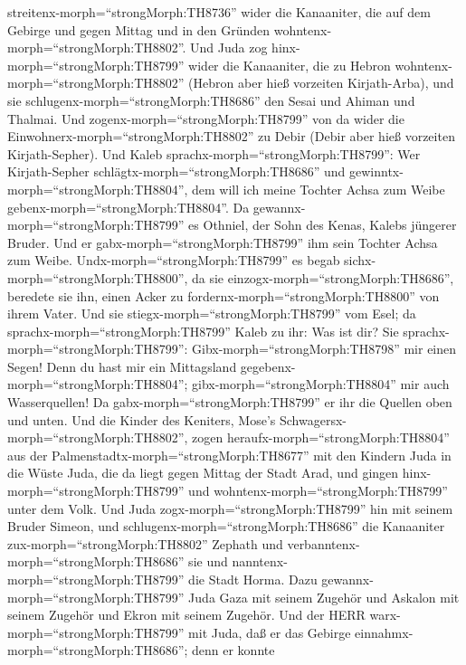 streitenx-morph=``strongMorph:TH8736'' wider die Kanaaniter, die auf dem
Gebirge und gegen Mittag und in den Gründen
wohntenx-morph=``strongMorph:TH8802''.  Und Juda zog
hinx-morph=``strongMorph:TH8799'' wider die Kanaaniter, die zu Hebron
wohntenx-morph=``strongMorph:TH8802'' (Hebron aber hieß vorzeiten
Kirjath-Arba), und sie schlugenx-morph=``strongMorph:TH8686'' den Sesai
und Ahiman und Thalmai.  Und
zogenx-morph=``strongMorph:TH8799'' von da wider die
Einwohnerx-morph=``strongMorph:TH8802'' zu Debir (Debir aber hieß
vorzeiten Kirjath-Sepher).  Und Kaleb
sprachx-morph=``strongMorph:TH8799'': Wer Kirjath-Sepher
schlägtx-morph=``strongMorph:TH8686'' und
gewinntx-morph=``strongMorph:TH8804'', dem will ich meine Tochter Achsa
zum Weibe gebenx-morph=``strongMorph:TH8804''.  Da
gewannx-morph=``strongMorph:TH8799'' es Othniel, der Sohn des Kenas,
Kalebs jüngerer Bruder. Und er gabx-morph=``strongMorph:TH8799'' ihm
sein Tochter Achsa zum Weibe. 
Undx-morph=``strongMorph:TH8799'' es begab
sichx-morph=``strongMorph:TH8800'', da sie
einzogx-morph=``strongMorph:TH8686'', beredete sie ihn, einen Acker zu
fordernx-morph=``strongMorph:TH8800'' von ihrem Vater. Und sie
stiegx-morph=``strongMorph:TH8799'' vom Esel; da
sprachx-morph=``strongMorph:TH8799'' Kaleb zu ihr: Was ist dir?
 Sie sprachx-morph=``strongMorph:TH8799'':
Gibx-morph=``strongMorph:TH8798'' mir einen Segen! Denn du hast mir ein
Mittagsland gegebenx-morph=``strongMorph:TH8804'';
gibx-morph=``strongMorph:TH8804'' mir auch Wasserquellen! Da
gabx-morph=``strongMorph:TH8799'' er ihr die Quellen oben und unten.
 Und die Kinder des Keniters, Mose's
Schwagersx-morph=``strongMorph:TH8802'', zogen
heraufx-morph=``strongMorph:TH8804'' aus der
Palmenstadtx-morph=``strongMorph:TH8677'' mit den Kindern Juda in die
Wüste Juda, die da liegt gegen Mittag der Stadt Arad, und gingen
hinx-morph=``strongMorph:TH8799'' und
wohntenx-morph=``strongMorph:TH8799'' unter dem Volk.  Und
Juda zogx-morph=``strongMorph:TH8799'' hin mit seinem Bruder Simeon, und
schlugenx-morph=``strongMorph:TH8686'' die Kanaaniter
zux-morph=``strongMorph:TH8802'' Zephath und
verbanntenx-morph=``strongMorph:TH8686'' sie und
nanntenx-morph=``strongMorph:TH8799'' die Stadt Horma. 
Dazu gewannx-morph=``strongMorph:TH8799'' Juda Gaza mit seinem Zugehör
und Askalon mit seinem Zugehör und Ekron mit seinem Zugehör.
 Und der HERR warx-morph=``strongMorph:TH8799'' mit Juda,
daß er das Gebirge einnahmx-morph=``strongMorph:TH8686''; denn er konnte
